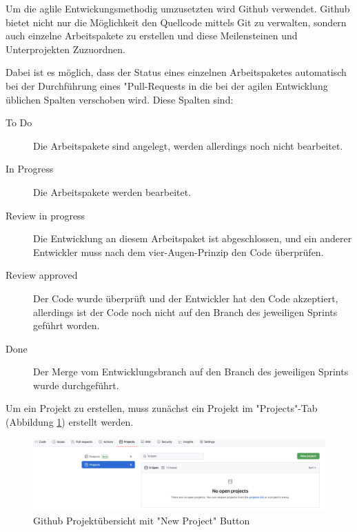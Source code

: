 \label{sec:github}

Um die aglile Entwickungsmethodig umzusetzten wird Github verwendet. 
Github bietet nicht nur die Möglichkeit den Quellcode mittels Git zu verwalten, sondern auch einzelne Arbeitspakete zu erstellen und diese Meilensteinen und Unterprojekten Zuzuordnen.

Dabei ist es möglich, dass der Status eines einzelnen Arbeitspaketes automatisch bei der Durchführung eines "Pull-Requests in die bei der agilen Entwicklung üblichen Spalten verschoben wird. Diese Spalten sind:

\begin{description}
    \item[To Do] Die Arbeitspakete sind angelegt, werden allerdings noch nicht bearbeitet.
    \item[In Progress] Die Arbeitspakete werden bearbeitet.
    \item[Review in progress] Die Entwicklung an diesem Arbeitspaket ist abgeschlossen, und ein anderer Entwickler muss nach dem vier-Augen-Prinzip den Code überprüfen. 
    \item[Review approved] Der Code wurde überprüft und der Entwickler hat den Code akzeptiert, allerdings ist der Code noch nicht auf den Branch des jeweiligen Sprints geführt worden.
    \item[Done] Der Merge vom Entwicklungsbranch auf den Branch des jeweiligen Sprints wurde durchgeführt.
\end{description}



Um ein Projekt zu erstellen, muss zunächst ein Projekt im "Projects"-Tab (Abbildung \ref{fig:newProject}) erstellt werden.

\begin{figure}[H]
    \centering
    \includegraphics[width=\textwidth]{media/ProjectManagement/CreateProject.png}
    \caption{Github Projektübersicht mit "New Project" Button}
    \label{fig:newProject}
\end{figure}

